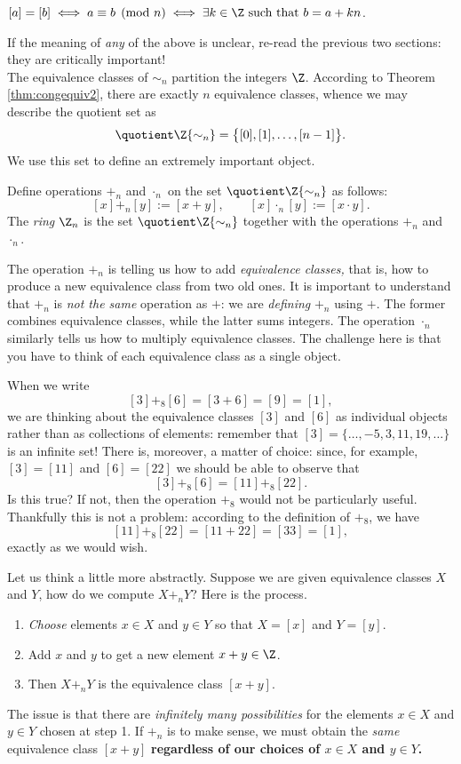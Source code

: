 \begin{thm}\label{thm:congequiv2}
$[a]=[b]\iff a\equiv b\pmod n\iff \exists k\in\Z\text{ such that }b=a+kn$.
\end{thm}

\noindent If the meaning of \emph{any} of the above is unclear, re-read the previous two sections: they are critically important!\\
The equivalence classes of $\sim_n$ partition the integers $\Z$. According to Theorem \ref{thm:congequiv2}, there are exactly $n$ equivalence classes, whence we may describe the quotient set as
\[\quotient \Z{\sim_n}=\big\{[0],[1],\ldots,[n-1]\big\}.\]
We use this set to define an extremely important object.

\begin{defn}
Define operations $+_n$ and $\cdot_n$ on the set $\quotient\Z{\sim_n}$ as follows:
\[[x]+_n[y]:=[x+y],\qquad [x]\cdot_n[y]:=[x\cdot y].\]
The \emph{ring} $\Z_n$ is the set $\quotient\Z{\sim_n}$ together with the operations $+_n$ and $\cdot_n$.
\end{defn}

\noindent The operation $+_n$ is telling us how to add \emph{equivalence classes,} that is, how to produce a new equivalence class from two old ones. It is important to understand that $+_n$ is \emph{not the same} operation as $+$: we are \emph{defining} $+_n$ using $+$. The former combines equivalence classes, while the latter sums integers. The operation $\cdot_n$ similarly tells us how to multiply equivalence classes. The challenge here is that you have to think of each equivalence class as a single object. 

\begin{example}
When we write
\[[3]+_8[6]=[3+6]=[9]=[1],\]
we are thinking about the equivalence classes $[3]$ and $[6]$ as individual objects rather than as collections of elements: remember that $[3]=\{\ldots,-5,3,11,19,\ldots\}$ is an infinite set! There is, moreover, a matter of choice: since, for example, $[3]=[11]$ and $[6]=[22]$ we should be able to observe that
\[[3]+_8[6]=[11]+_8[22].\]
Is this true? If not, then the operation $+_8$ would not be particularly useful. Thankfully this is not a problem: according to the definition of $+_8$, we have
\[[11]+_8[22]=[11+22]=[33]=[1],\]
exactly as we would wish.
\end{example}

Let us think a little more abstractly. Suppose we are given equivalence classes $X$ and $Y$, how do we compute $X+_nY$? Here is the process.
\begin{enumerate}
  \item \emph{Choose} elements $x\in X$ and $y\in Y$ so that $X=[x]$ and $Y=[y]$.
  \item Add $x$ and $y$ to get a new element $x+y\in\Z$.
  \item Then $X+_nY$ is the equivalence class $[x+y]$.
\end{enumerate}
The issue is that there are \emph{infinitely many possibilities} for the elements $x\in X$ and $y\in Y$ chosen at step 1. If $+_n$ is to make sense, we must obtain the \emph{same} equivalence class $[x+y]$ {\bf regardless of our choices of $x\in X$ and $y\in Y$.}

